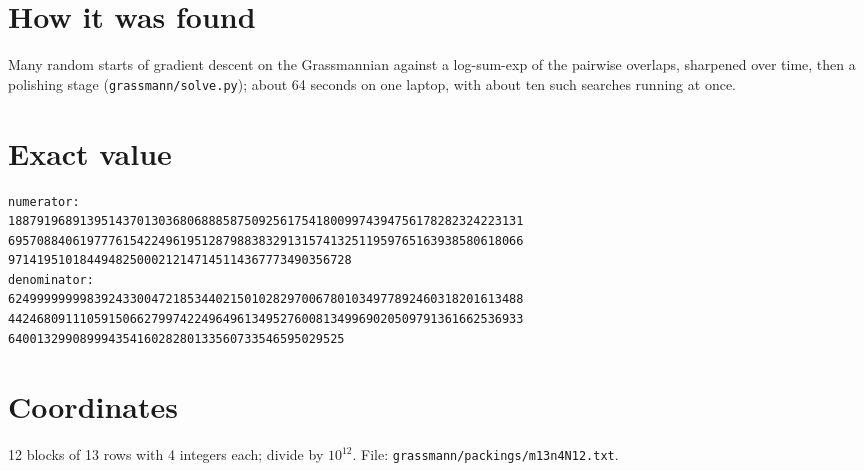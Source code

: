 \documentclass[11pt,a4paper]{article}
\begin{document}
\section{How it was found}
Many random starts of gradient descent on the Grassmannian against a log-sum-exp of the pairwise overlaps, sharpened over time, then a polishing stage (\texttt{grassmann/solve.py}); about 64 seconds on one laptop, with about ten such searches running at once.


\appendix
\section{Exact value}
{\small
\begin{verbatim}
numerator:
188791968913951437013036806888587509256175418009974394756178282324223131
695708840619777615422496195128798838329131574132511959765163938580618066
971419510184494825000212147145114367773490356728
denominator:
624999999998392433004721853440215010282970067801034977892460318201613488
442468091110591506627997422496496134952760081349969020509791361662536933
64001329908999435416028280133560733546595029525
\end{verbatim}}

\section{Coordinates}
12 blocks of 13 rows with 4 integers each; divide by $10^{12}$. File: \texttt{grassmann/packings/m13n4N12.txt}.
{\tiny
\begin{multicols}{3}
\end{multicols}}
\end{document}
